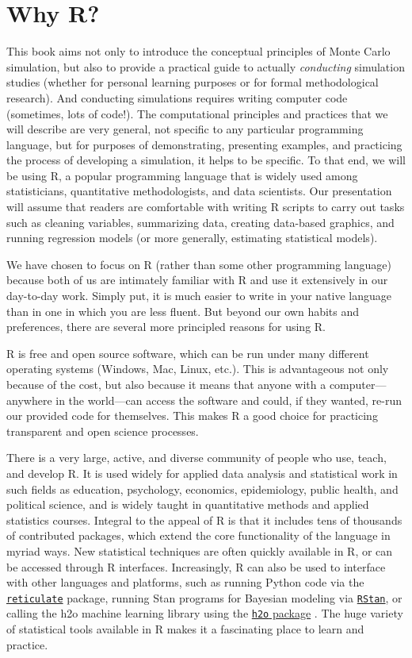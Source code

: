 \documentclass[
]{book}
\begin{document}
\section{Why R?}\label{why-r}

This book aims not only to introduce the conceptual principles of Monte Carlo simulation, but also to provide a practical guide to actually \emph{conducting} simulation studies (whether for personal learning purposes or for formal methodological research).
And conducting simulations requires writing computer code (sometimes, lots of code!).
The computational principles and practices that we will describe are very general, not specific to any particular programming language, but for purposes of demonstrating, presenting examples, and practicing the process of developing a simulation, it helps to be specific.
To that end, we will be using R, a popular programming language that is widely used among statisticians, quantitative methodologists, and data scientists.
Our presentation will assume that readers are comfortable with writing R scripts to carry out tasks such as cleaning variables, summarizing data, creating data-based graphics, and running regression models (or more generally, estimating statistical models).

We have chosen to focus on R (rather than some other programming language) because both of us are intimately familiar with R and use it extensively in our day-to-day work.
Simply put, it is much easier to write in your native language than in one in which you are less fluent.
But beyond our own habits and preferences, there are several more principled reasons for using R.

R is free and open source software, which can be run under many different operating systems (Windows, Mac, Linux, etc.).
This is advantageous not only because of the cost, but also because it means that anyone with a computer---anywhere in the world---can access the software and could, if they wanted, re-run our provided code for themselves.
This makes R a good choice for practicing transparent and open science processes.

There is a very large, active, and diverse community of people who use, teach, and develop R.
It is used widely for applied data analysis and statistical work in such fields as education, psychology, economics, epidemiology, public health, and political science,
and is widely taught in quantitative methods and applied statistics courses.
Integral to the appeal of R is that it includes tens of thousands of contributed packages, which extend the core functionality of the language in myriad ways.
New statistical techniques are often quickly available in R, or can be accessed through R interfaces.
Increasingly, R can also be used to interface with other languages and platforms, such as running Python code via the \href{https://rstudio.github.io/reticulate/}{\texttt{reticulate}} package, running Stan programs for Bayesian modeling via \href{https://mc-stan.org/users/interfaces/rstan}{\texttt{RStan}}, or calling the h2o machine learning library using the \href{https://cran.r-project.org/package=h2o}{\texttt{h2o} package} \citep{fryda2014H2oInterfaceH2O}.
The huge variety of statistical tools available in R makes it a fascinating place to learn and practice.
\end{document}
